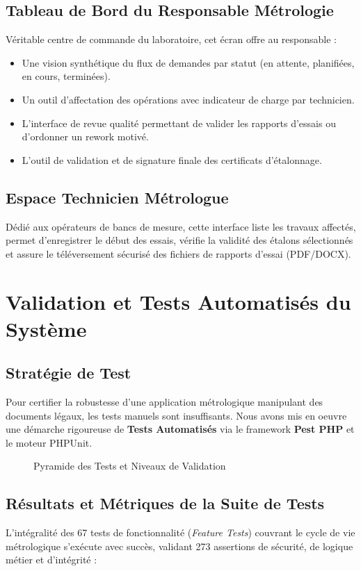 \documentclass{bts-report}
\begin{document}
\subsection{Tableau de Bord du Responsable M\'etrologie}
V\'eritable centre de commande du laboratoire, cet \'ecran offre au responsable :
\begin{itemize}
  \item Une vision synth\'etique du flux de demandes par statut (en attente, planifi\'ees, en cours, termin\'ees).
  \item Un outil d'affectation des op\'erations avec indicateur de charge par technicien.
  \item L'interface de revue qualit\'e permettant de valider les rapports d'essais ou d'ordonner un rework motiv\'e.
  \item L'outil de validation et de signature finale des certificats d'\'etalonnage.
\end{itemize}

\subsection{Espace Technicien M\'etrologue}
D\'edi\'e aux op\'erateurs de bancs de mesure, cette interface liste les travaux affect\'es, permet d'enregistrer le d\'ebut des essais, v\'erifie la validit\'e des \'etalons s\'electionn\'es et assure le t\'el\'eversement s\'ecuris\'e des fichiers de rapports d'essai (PDF/DOCX).

\section{Validation et Tests Automatis\'es du Syst\`eme}
\subsection{Strat\'egie de Test}
Pour certifier la robustesse d'une application m\'etrologique manipulant des documents l\'egaux, les tests manuels sont insuffisants. Nous avons mis en oeuvre une d\'emarche rigoureuse de \textbf{Tests Automatis\'es} via le framework \textbf{Pest PHP} et le moteur PHPUnit.

\begin{figure}[H]
  \centering
  
  \caption{Pyramide des Tests et Niveaux de Validation}
  \label{fig:testing-pyramid}
\end{figure}

\subsection{R\'esultats et M\'etriques de la Suite de Tests}
L'int\'egralit\'e des 67 tests de fonctionnalit\'e (\textit{Feature Tests}) couvrant le cycle de vie m\'etrologique s'ex\'ecute avec succ\`es, validant 273 assertions de s\'ecurit\'e, de logique m\'etier et d'int\'egrit\'e :
\end{document}
